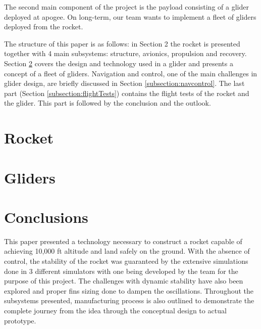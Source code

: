 \documentclass[]{iac}
\begin{document}



The second main component of the project is the payload consisting of a glider deployed at apogee. On long-term, our team wants to implement a fleet of gliders deployed from the rocket.


The structure of this paper is as follows: in Section 2 the rocket is presented together with 4 main subsystems: structure, avionics, propulsion and recovery. Section \ref{section:gliders}  covers the design and technology used in a glider and presents a concept of a fleet of gliders. Navigation and control, one of the main challenges in glider design, are briefly discussed in Section \ref{subsection:navcontrol}. The last part (Section \ref{subsection:flightTests}) contains the flight tests of the rocket and the glider. This part is followed by the conclusion and the outlook.


\section{Rocket}




\section{Gliders}
\label{section:gliders}






\section{Conclusions}
This paper presented a technology necessary to construct a rocket capable of achieving 10,000 ft altitude and land safely on the ground. With the absence of control, the stability of the rocket was guaranteed by the extensive simulations done in 3 different simulators with one being developed by the team for the purpose of this project. The challenges with dynamic stability have also been explored and proper fins sizing done to dampen the oscillations. Throughout the subsystems presented, manufacturing process is also outlined to demonstrate the complete journey from the idea through the conceptual design to actual prototype.
\end{document}
